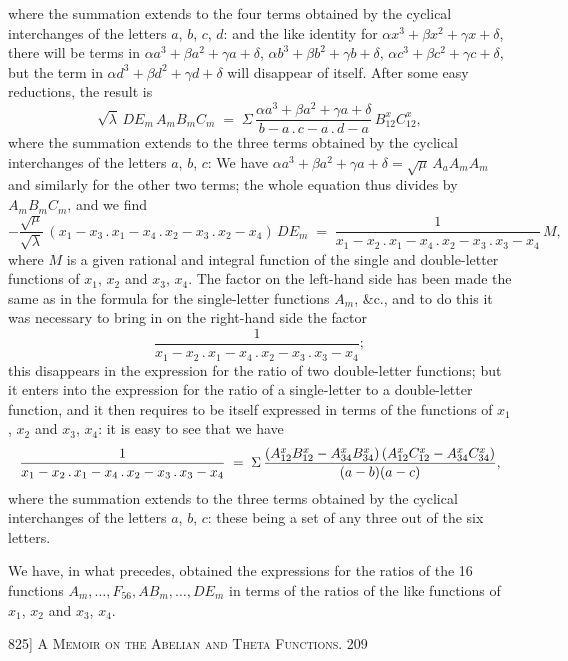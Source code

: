 \documentclass[11pt]{article}
\begin{document}
\noindent
where the summation extends to the four terms obtained by the cyclical interchanges
of the letters $a$, $b$, $c$, $d$: and the like identity for $\alpha x^{3}+\beta x^{2}+\gamma x+\delta$, there will be
terms in $\alpha a^{3}+\beta a^{2}+\gamma a+\delta$, $\alpha b^{3}+\beta b^{2}+\gamma b+\delta$, $\alpha c^{3}+\beta c^{2}+\gamma c+\delta$, but the term in
$\alpha d^{3}+\beta d^{2}+\gamma d+\delta$ will disappear of itself.  After some easy reductions, the result is
\[
\sqrt{\lambda}\,DE_{m}\,A_{m}B_{m}C_{m}
 \;=\; \Sigma\,\frac{\alpha a^{3}+\beta a^{2}+\gamma a+\delta}{b-a\,.\,c-a\,.\,d-a}\,B_{12}^{x}C_{12}^{x},
\]
where the summation extends to the three terms obtained by the cyclical interchanges
of the letters $a$, $b$, $c$: We have $\alpha a^{3}+\beta a^{2}+\gamma a+\delta = \sqrt{\mu}\,A_{a}A_{m}A_{m}$ and similarly for the
other two terms; the whole equation thus divides by $A_{m}B_{m}C_{m}$, and we find
\[
-\frac{\sqrt{\mu}}{\sqrt{\lambda}}\,(x_{1}-x_{3}\,.\,x_{1}-x_{4}\,.\,x_{2}-x_{3}\,.\,x_{2}-x_{4})\,DE_{m}
 \;=\; \frac{1}{x_{1}-x_{2}\,.\,x_{1}-x_{4}\,.\,x_{2}-x_{3}\,.\,x_{3}-x_{4}}\,M,
\]
where $M$ is a given rational and integral function of the single and double-letter
functions of $x_{1}$, $x_{2}$ and $x_{3}$, $x_{4}$.  The factor on the left-hand side has been made the
same as in the formula for the single-letter functions $A_{m}$, \&c., and to do this it was
necessary to bring in on the right-hand side the factor
\[
\frac{1}{x_{1}-x_{2}\,.\,x_{1}-x_{4}\,.\,x_{2}-x_{3}\,.\,x_{3}-x_{4}};
\]
this disappears in the expression for the ratio of two double-letter functions; but it
enters into the expression for the ratio of a single-letter to a double-letter function,
and it then requires to be itself expressed in terms of the functions of $x_{1}$, $x_{2}$ and
$x_{3}$, $x_{4}$: it is easy to see that we have
\[
\resizebox{\textwidth}{!}{$\displaystyle
\frac{1}{x_{1}-x_{2}\,.\,x_{1}-x_{4}\,.\,x_{2}-x_{3}\,.\,x_{3}-x_{4}}
 \;=\; \Sigma\,\frac{(A^{x}_{12}B_{12}^{x}-A^{x}_{34}B_{34}^{x})\,(A^{x}_{12}C_{12}^{x}-A^{x}_{34}C_{34}^{x})}{(a-b)(a-c)},
$}
\]
where the summation extends to the three terms obtained by the cyclical interchanges
of the letters $a$, $b$, $c$: these being a set of any three out of the six letters.

We have, in what precedes, obtained the expressions for the ratios of the 16
functions $A_{m},\ldots,F_{56},AB_{m},\ldots,DE_{m}$ in terms of the ratios of the like functions of $x_{1}$, $x_{2}$
and $x_{3}$, $x_{4}$.

\newpage
\noindent\textsc{825] \hfill A Memoir on the Abelian and Theta Functions. \hfill 209}
\vspace{0.8em}
\end{document}
